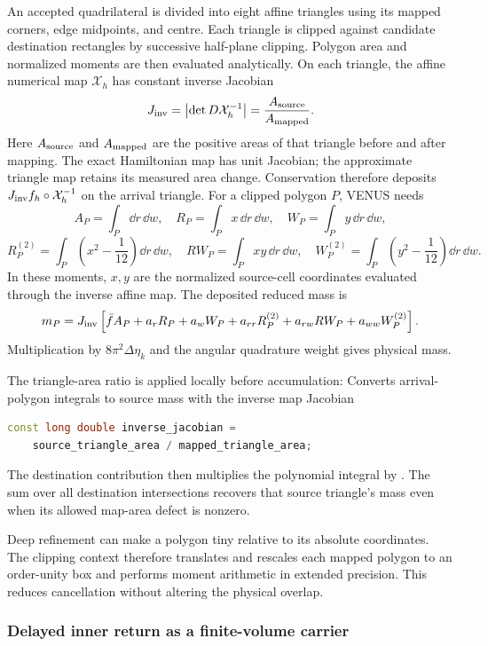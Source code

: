 An accepted quadrilateral is divided into eight affine triangles using its
mapped corners, edge midpoints, and centre.  Each triangle is clipped against
candidate destination rectangles by successive half-plane clipping.  Polygon
area and normalized moments are then evaluated analytically.  On each
triangle, the affine numerical map \(\mathcal X_h\) has constant inverse
Jacobian
\[
 J_{\rm inv}=\left|\det D\mathcal X_h^{-1}\right|
 =\frac{A_{\rm source}}{A_{\rm mapped}}.
\]
Here \(A_{\rm source}\) and \(A_{\rm mapped}\) are the positive areas of
that triangle before and after mapping.  The exact Hamiltonian map has
unit Jacobian; the approximate triangle map retains its measured area
change.  Conservation therefore deposits
\(J_{\rm inv} f_h\circ\mathcal X_h^{-1}\) on the arrival triangle.
For a clipped polygon \(P\), VENUS needs
\[
 A_P=\int_P\dd r\,\dd w,\quad
 R_P=\int_P x\,\dd r\,\dd w,\quad
 W_P=\int_P y\,\dd r\,\dd w,
\]
\[
 R^{(2)}_P=\int_P\left(x^2-\frac1{12}\right)\dd r\,\dd w,
\quad
 RW_P=\int_Pxy\,\dd r\,\dd w,
\quad
 W^{(2)}_P=\int_P\left(y^2-\frac1{12}\right)\dd r\,\dd w .
\]
In these moments, \(x,y\) are the normalized source-cell coordinates
evaluated through the inverse affine map.  The deposited reduced mass is
\[
 m_P=J_{\rm inv}\left[\bar f A_P+a_rR_P+a_wW_P
 +a_{rr}R^{(2)}_P+a_{rw}RW_P+a_{ww}W^{(2)}_P\right].
\]
Multiplication by \(8\pi^2\Delta\eta_k\) and the angular quadrature weight
gives physical mass.

The triangle-area ratio is applied locally before accumulation:
{}
{Converts arrival-polygon integrals to source mass with the inverse map Jacobian}
\begin{lstlisting}[language=C++]
const long double inverse_jacobian =
    source_triangle_area / mapped_triangle_area;
\end{lstlisting}
The destination contribution then multiplies the polynomial integral by
.  The sum over all destination intersections
recovers that source triangle's mass even when its allowed map-area defect
is nonzero.

Deep refinement can make a polygon tiny relative to its absolute coordinates.
The clipping context therefore translates and rescales each mapped polygon to
an order-unity box and performs moment arithmetic in extended precision.  This
reduces cancellation without altering the physical overlap.

\subsubsection{Delayed inner return as a finite-volume carrier}
\label{sec:sldg-delayed-carrier}

